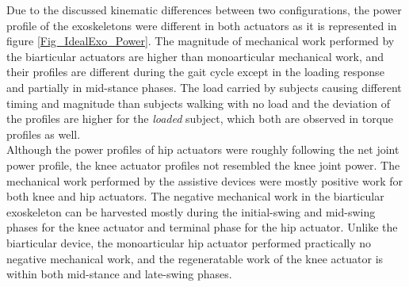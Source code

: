 \documentclass[10pt,letterpaper]{article}
\begin{document}
Due to the discussed kinematic differences between two configurations, the power profile of the exoskeletons were different in both actuators as it is represented in figure \ref{Fig_IdealExo_Power}. The magnitude of mechanical work performed by the biarticular actuators are higher than monoarticular mechanical work, and their profiles are different during the gait cycle except in the loading response and partially in mid-stance phases. The load carried by subjects causing different timing and magnitude than subjects walking with no load and the deviation of the profiles are higher for the \textit{loaded} subject, which both are observed in torque profiles as well.\\
Although the power profiles of hip actuators were roughly following the net joint power profile, the knee actuator profiles not resembled the knee joint power. The mechanical work performed by the assistive devices were mostly positive work for both knee and hip actuators. The negative mechanical work in the biarticular exoskeleton can be harvested mostly during the initial-swing and mid-swing phases for the knee actuator and terminal phase for the hip actuator. Unlike the biarticular device, the monoarticular hip actuator performed practically no negative mechanical work, and the regeneratable work of the knee actuator is within both mid-stance and late-swing phases.
\end{document}
